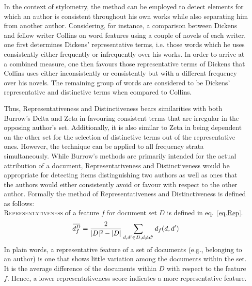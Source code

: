 \documentclass[a4paper,10pt,twoside,fleqn]{article}
\newcommand{\overbar}[1]{\mkern 2.0mu\overline{\mkern-2.0mu#1\mkern-2.0mu}\mkern 2.0mu}
\begin{document}
In the context of stylometry, the method can be employed to detect elements for
which an author is consistent throughout his own works while also separating him
from another author.
Considering, for instance, a comparison between Dickens and fellow
writer Collins on word features using a couple of novels of each writer,
one first determines Dickens' representative terms, i.e. those words which he
uses consistently either frequently or infrequently over his works.
In order to arrive at a combined measure, one then favours those representative
terms of Dickens that Collins uses either inconsistently or consistently but with a
different frequency over his novels. The remaining group of words are considered
to be Dickens' representative and distinctive terms when compared to Collins.

Thus, Representativeness and Distinctiveness bears similarities with both
Burrow's Delta \cite{Burrows2002delta} and Zeta  \cite{Burrows2007all} in
favouring consistent terms that are irregular in the opposing author's set.
Additionally, it is also similar to Zeta in being dependent on the other set
for the selection of distinctive terms out of the representative ones.
However, the technique can be applied to all frequency strata simultaneously.
While Burrow's methods are primarily intended for the actual attribution
of a document, Representativeness and Distinctiveness would be appropriate
for detecting items distinguishing two authors as well as ones that
the authors would either consistently avoid or favour with respect to
the other author.
Formally the method of Representativeness and Distinctiveness is defined
as follows: \\

\textsc{Representativeness} of a feature $f$ for document set $D$ is defined
in eq.~\ref{eq.Rep}. \\


 \begin{equation}\label{eq.Rep}
 \overbar{d_f^{D}} = \frac{2}{|D|^{2} -|D|} \sum\limits_{d,d' \in D,d \neq d'} d_f(d,d')
 \end{equation}
In plain words, a representative feature of a set of documents 
(e.g., belonging to an author) 
is one that shows little variation among the documents within the set.
It is the average difference of the documents within $D$ with respect to the feature $f$.
Hence, a lower representativeness score indicates a more representative feature.
%
%
\end{document}

